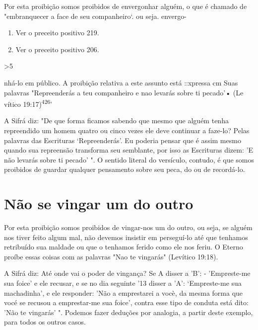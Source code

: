Por esta proibição somos proibidos de envergonhar alguém, o que é
chamado de "embranquecer a face de seu companheiro`. ou seja. envergo-


\begin{enumerate}
\def\labelenumi{\arabic{enumi}.}
\setcounter{enumi}{423}
\item
 
 Ver o preceito positivo 219.
 
\item
 
 Ver o preceito positivo 206.
 
\end{enumerate}




\textgreater5

nhá-lo em público. A proibição relativa a este assunto está ::xpressa cm
Suas palavras "Repreenderás a teu companheiro e nao levarás sobre ti
pecado'• (Le vítico 19:17)\textsuperscript{426}'

A Sifrá diz: "De que forma ficamos sabendo que mesmo que alguém tenha
repreendido um homem quatro ou cinco vezes ele deve continuar a faze-lo?
Pelas palavras das Escrituras `Repreenderás'. Eu poderia pensar que é
assim mesmo quando sua repreensão transforma seu semblante, por isso as
Escritu­ras dizem: 'E não levarás sobre ti pecado' ". O sentido literal
do versículo, con­tudo, é que somos proibidos de guardar qualquer
pensamento sobre seu peca, do ou de recordá-lo.

\section{Não se vingar um do outro}

Por esta proibição somos proibidos de vingar-nos um do outro, ou seja,
se alguém nos tiver feito algum mal, não devemos insistir em perseguí-lo
até que tenhamos retribuído sua maldade ou que o tenhamos ferido como
ele nos feriu. O Eterno proíbe essas coisas com as palavras "Nao te
vingarás" (Le­vítico 19:18).

A Sifrá diz: Até onde vai o poder de vingança? Se A disser a 'B': -
'Empreste-me sua foice' e ele recusar, e se no dia seguinte '13 disser a
'A': `Empreste-me sua machadinha', e ele responder: 'Não a emprestarei a
vocè, da mesma forma que vocé se recusou a emprestar-me sua foice',
contra esse tipo de conduta está dito: 'Não te vingarás' ". Podemos
fazer deduções por analo­gia, a partir deste exemplo, para todos os
outros casos.

